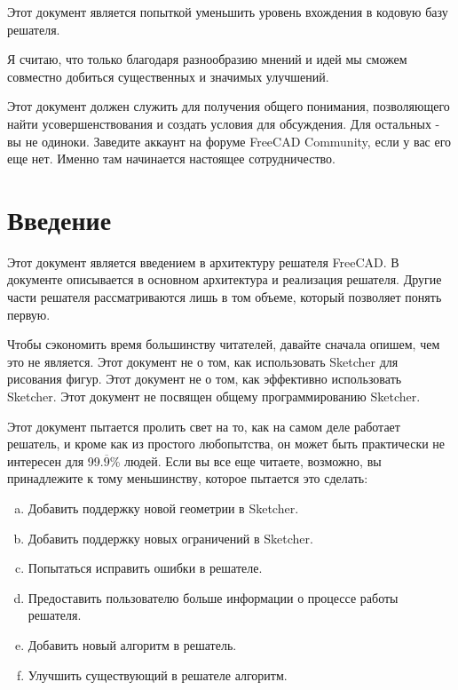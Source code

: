 \documentclass[12pt,twoside,a4paper]{book}
\newcommand{\textoverline}[1]{$\overline{\mbox{#1}}$}
\begin{document}
    Этот документ является попыткой уменьшить уровень вхождения в кодовую базу решателя.

    Я считаю, что только благодаря разнообразию мнений и идей мы сможем совместно добиться существенных и значимых улучшений.

    Этот документ должен служить для получения общего понимания, позволяющего найти усовершенствования и создать условия для обсуждения. Для остальных - вы не одиноки. Заведите аккаунт на форуме FreeCAD Community, если у вас его еще нет. Именно там начинается настоящее сотрудничество.

    \tableofcontents
    \newpage

    \mainmatter

    \chapter{Введение}

Этот документ является введением в архитектуру решателя FreeCAD. В документе описывается в основном архитектура и реализация решателя. Другие части решателя рассматриваются лишь в том объеме, который позволяет понять первую.

    Чтобы сэкономить время большинству читателей, давайте сначала опишем, чем это не является. Этот документ не о том, как использовать Sketcher для рисования фигур. Этот документ не о том, как эффективно использовать Sketcher. Этот документ не посвящен общему программированию Sketcher.

    Этот документ пытается пролить свет на то, как на самом деле работает решатель, и кроме как из простого любопытства, он может быть практически не интересен для 99.\textoverline{9}\% людей. Если вы все еще читаете, возможно, вы принадлежите к тому меньшинству, которое пытается это сделать:
\begin{enumerate}[a)].
    \item Добавить поддержку новой геометрии в Sketcher.
    \item Добавить поддержку новых ограничений в Sketcher.
    \item Попытаться исправить ошибки в решателе.
    \item Предоставить пользователю больше информации о процессе работы решателя.
    \item Добавить новый алгоритм в решатель.
    \item Улучшить существующий в решателе алгоритм.
    \end{enumerate}
\end{document}
